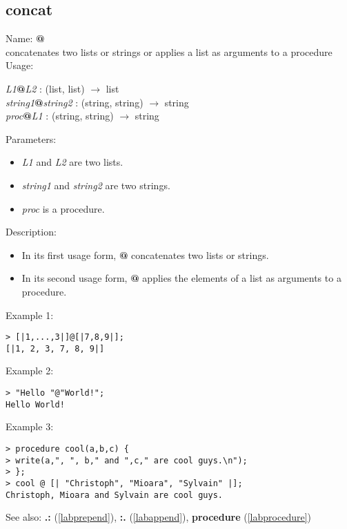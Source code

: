 \subsection{concat}
\label{labconcat}
\noindent Name: \textbf{@}\\
concatenates two lists or strings or applies a list as arguments to a procedure\\

\noindent Usage: 
\begin{center}
\emph{L1}\textbf{@}\emph{L2} : (\textsf{list}, \textsf{list}) $\rightarrow$ \textsf{list}\\
\emph{string1}\textbf{@}\emph{string2} : (\textsf{string}, \textsf{string}) $\rightarrow$ \textsf{string}\\
\emph{proc}\textbf{@}\emph{L1} : (\textsf{string}, \textsf{string}) $\rightarrow$ \textsf{string}\\
\end{center}
Parameters: 
\begin{itemize}
\item \emph{L1} and \emph{L2} are two lists.
\item \emph{string1} and \emph{string2} are two strings.
\item \emph{proc} is a procedure.
\end{itemize}
\noindent Description: \begin{itemize}

\item In its first usage form, \textbf{@} concatenates two lists or strings.

\item In its second usage form, \textbf{@} applies the elements of a list as
   arguments to a procedure.
\end{itemize}
\noindent Example 1: 
\begin{center}\begin{minipage}{15cm}\begin{Verbatim}[frame=single]
> [|1,...,3|]@[|7,8,9|];
[|1, 2, 3, 7, 8, 9|]
\end{Verbatim}
\end{minipage}\end{center}
\noindent Example 2: 
\begin{center}\begin{minipage}{15cm}\begin{Verbatim}[frame=single]
> "Hello "@"World!";
Hello World!
\end{Verbatim}
\end{minipage}\end{center}
\noindent Example 3: 
\begin{center}\begin{minipage}{15cm}\begin{Verbatim}[frame=single]
> procedure cool(a,b,c) { 
> write(a,", ", b," and ",c," are cool guys.\n");
> };
> cool @ [| "Christoph", "Mioara", "Sylvain" |];
Christoph, Mioara and Sylvain are cool guys.
\end{Verbatim}
\end{minipage}\end{center}
See also: \textbf{.:} (\ref{labprepend}), \textbf{:.} (\ref{labappend}), \textbf{procedure} (\ref{labprocedure})
